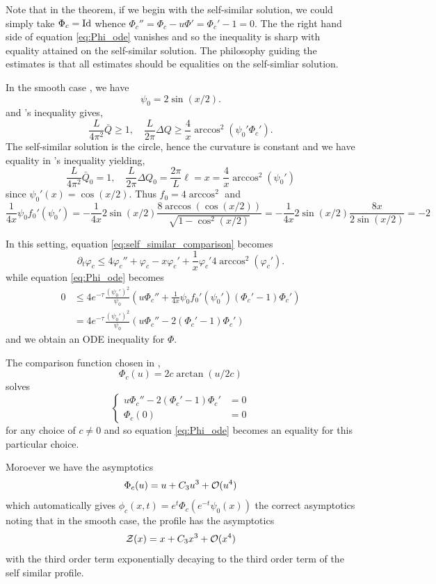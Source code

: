 \documentclass[11pt]{amsart}
\begin{document}
\begin{remark}
 Note that in the theorem, if we begin with the self-similar solution, we could simply take $\Phi_c = \operatorname{Id}$ whence $\Phi_c'' = \Phi_c - u \Phi' = \Phi_c' - 1 = 0$. The the right hand side of equation \eqref{eq:Phi_ode} vanishes and so the inequality is sharp with equality attained on the self-similar solution. The philosophy guiding the estimates is that all estimates should be equalities on the self-simliar solution.
\end{remark}

\begin{remark}
\label{rem:smooth_case}
In the smooth case \cite{MR2794630}, we have
\[
\psi_0 = 2 \sin(x/2).
\]
and \holder's inequality gives,
\[
\frac{L}{4\pi^2} \bar{Q} \geq 1, \quad \frac{L}{2\pi} \Delta Q \geq \frac{4}{x} \arccos^2(\psi_0'\Phi_c').
\]
The self-similar solution is the circle, hence the curvature is constant and we have equality in \holder{}'s inequality yielding,
\[
\frac{L}{4\pi^2} \bar{Q}_0 = 1, \quad \frac{L}{2\pi} \Delta Q_0 = \frac{2\pi}{L} \ell = x = \frac{4}{x} \arccos^2(\psi_0')
\]
since $\psi_0'(x) = \cos(x/2)$. Thus $f_0 = 4 \arccos^2$ and
\[
\frac{1}{4x} \psi_0 f_0'(\psi_0') = - \frac{1}{4x} 2 \sin(x/2) \frac{8\arccos(\cos(x/2))}{\sqrt{1 - \cos^2(x/2)}} = - \frac{1}{4x} 2 \sin(x/2) \frac{8x}{2\sin(x/2)} = -2
\]

In this setting, equation \eqref{eq:self_similar_comparison} becomes
\[
\partial_t \varphi_c \leq 4 \varphi_c'' + \varphi_c - x\varphi_c' + \frac{1}{x} \varphi_c' 4\arccos^2(\varphi_c').
\]
while equation \eqref{eq:Phi_ode} becomes
\[
\begin{split}
0 &\leq 4 e^{-\tau} \frac{(\psi_0')^2}{\psi_0} \left(u \Phi_c'' + \frac{1}{4x} \psi_0 f_0'(\psi_0')(\Phi_c' - 1) \Phi_c'\right) \\
&= 4 e^{-\tau} \frac{(\psi_0')^2}{\psi_0} \left(u \Phi_c'' - 2 (\Phi_c' - 1) \Phi_c'\right)
\end{split}
\]
and we obtain an ODE inequality for $\Phi$.

The comparison function chosen in \cite{MR2794630},
\[
\Phi_c (u) = 2 c \arctan(u/2c)
\]
solves
\[
\begin{cases}
u \Phi_c'' - 2 (\Phi_c' - 1) \Phi_c' &= 0 \\
\Phi_c(0) &= 0
\end{cases}
\]
for any choice of $c \ne 0$ and so equation \eqref{eq:Phi_ode} becomes an equality for this particular choice.

Moroever we have the asymptotics
\[
\Phi_c(u) = u + C_3 u^3 + \operatorname{\mathcal{O}}(u^4)
\]
which automatically gives $\phi_c(x, t) = e^t \Phi_c (e^{-t} \psi_0(x))$ the correct asymptotics noting that in the smooth case, the profile has the asymptotics
\[
\operatorname{\mathcal{Z}}(x) = x + C_3 x^3 + \operatorname{\mathcal{O}}(x^4)
\]
with the third order term exponentially decaying to the third order term of the self similar profile.
\end{remark}
\end{document}
